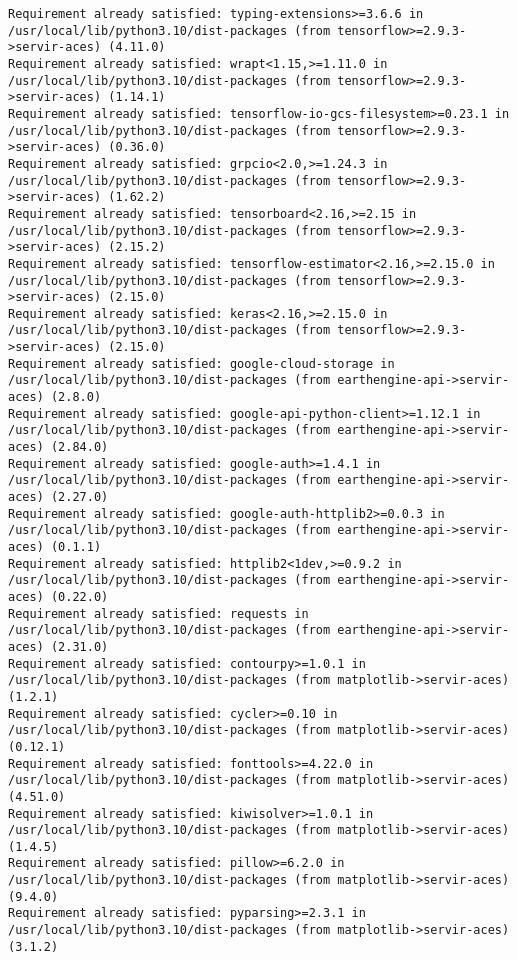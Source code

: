 \documentclass[
  letterpaper,
  DIV=11,
  numbers=noendperiod]{scrreprt}
\begin{document}
\begin{verbatim}
Requirement already satisfied: typing-extensions>=3.6.6 in /usr/local/lib/python3.10/dist-packages (from tensorflow>=2.9.3->servir-aces) (4.11.0)
Requirement already satisfied: wrapt<1.15,>=1.11.0 in /usr/local/lib/python3.10/dist-packages (from tensorflow>=2.9.3->servir-aces) (1.14.1)
Requirement already satisfied: tensorflow-io-gcs-filesystem>=0.23.1 in /usr/local/lib/python3.10/dist-packages (from tensorflow>=2.9.3->servir-aces) (0.36.0)
Requirement already satisfied: grpcio<2.0,>=1.24.3 in /usr/local/lib/python3.10/dist-packages (from tensorflow>=2.9.3->servir-aces) (1.62.2)
Requirement already satisfied: tensorboard<2.16,>=2.15 in /usr/local/lib/python3.10/dist-packages (from tensorflow>=2.9.3->servir-aces) (2.15.2)
Requirement already satisfied: tensorflow-estimator<2.16,>=2.15.0 in /usr/local/lib/python3.10/dist-packages (from tensorflow>=2.9.3->servir-aces) (2.15.0)
Requirement already satisfied: keras<2.16,>=2.15.0 in /usr/local/lib/python3.10/dist-packages (from tensorflow>=2.9.3->servir-aces) (2.15.0)
Requirement already satisfied: google-cloud-storage in /usr/local/lib/python3.10/dist-packages (from earthengine-api->servir-aces) (2.8.0)
Requirement already satisfied: google-api-python-client>=1.12.1 in /usr/local/lib/python3.10/dist-packages (from earthengine-api->servir-aces) (2.84.0)
Requirement already satisfied: google-auth>=1.4.1 in /usr/local/lib/python3.10/dist-packages (from earthengine-api->servir-aces) (2.27.0)
Requirement already satisfied: google-auth-httplib2>=0.0.3 in /usr/local/lib/python3.10/dist-packages (from earthengine-api->servir-aces) (0.1.1)
Requirement already satisfied: httplib2<1dev,>=0.9.2 in /usr/local/lib/python3.10/dist-packages (from earthengine-api->servir-aces) (0.22.0)
Requirement already satisfied: requests in /usr/local/lib/python3.10/dist-packages (from earthengine-api->servir-aces) (2.31.0)
Requirement already satisfied: contourpy>=1.0.1 in /usr/local/lib/python3.10/dist-packages (from matplotlib->servir-aces) (1.2.1)
Requirement already satisfied: cycler>=0.10 in /usr/local/lib/python3.10/dist-packages (from matplotlib->servir-aces) (0.12.1)
Requirement already satisfied: fonttools>=4.22.0 in /usr/local/lib/python3.10/dist-packages (from matplotlib->servir-aces) (4.51.0)
Requirement already satisfied: kiwisolver>=1.0.1 in /usr/local/lib/python3.10/dist-packages (from matplotlib->servir-aces) (1.4.5)
Requirement already satisfied: pillow>=6.2.0 in /usr/local/lib/python3.10/dist-packages (from matplotlib->servir-aces) (9.4.0)
Requirement already satisfied: pyparsing>=2.3.1 in /usr/local/lib/python3.10/dist-packages (from matplotlib->servir-aces) (3.1.2)

\end{verbatim}
\end{document}
